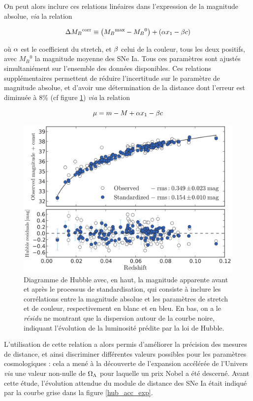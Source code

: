 \documentclass[a4paper, 12pt, svgnames]{article}
\begin{document}
On peut alors inclure ces relations linéaires dans l'expression de la magnitude
absolue, \textit{via} la relation

\begin{equation}
    \Delta M_B{}^{\text{corr}} \equiv \left(M_B{}^{\text{max}} - M_B{}^0\right) + \left(\alpha x_1
    - \beta c\right)
\end{equation}

où $\alpha$ est le coefficient du stretch, et $\beta$ celui de la couleur, tous les
deux positifs, avec $M_B{}^0$ la magnitude moyenne des SNe Ia. Tous ces
paramètres sont ajustés simultaniément sur l'ensemble des données disponibles.
Ces relations supplémentaires permettent de réduire l'incertitude sur le
paramètre de magnitude absolue, et d'avoir une détermination de la distance dont
l'erreur est diminuée à 8\% (cf figure \ref{disp_20}) \textit{via} la relation

\begin{equation}
    \mu = m - M +\alpha x_1 - \beta c
\end{equation}

\begin{figure}[htbp!]
    \centering
    \includegraphics[width=.5\linewidth]{Rapport_figures/disp_beau.png}
    \captionsetup{justification=centering}
    \caption{Diagramme de Hubble avec, en haut, la magnitude apparente avant et
        après le processus de standardisation, qui consiste à inclure les
        corrélations entre la magnitude absolue et les paramètres de stretch et
        de couleur, respectivement en blanc et en bleu. En bas, on a le
        \textit{résidu} ne montrant que la dispersion autour de la courbe noire,
        indiquant l'évolution de la luminosité prédite par la loi de Hubble.}
    \label{disp_20}
\end{figure}

L'utilisation de cette relation a alors permis d'améliorer la précision des
mesures de distance, et ainsi discriminer différentes valeurs possibles pour les
paramètres cosmologiques : cela a mené à la découverte de l'expansion accélérée
de l'Univers \textit{via} une valeur non-nulle de $\Omega_\Lambda$ pour laquelle un prix
Nobel a été descerné. Avant cette étude, l'évolution attendue du module de
distance des SNe Ia était indiqué par la courbe grise dans la figure
\ref{hub_acc_exp}.
\end{document}
